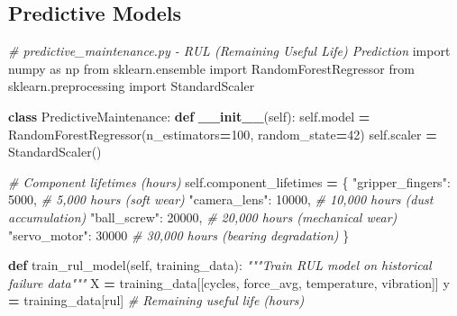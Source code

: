 \documentclass[
]{article}
\newenvironment{Shaded}{\begin{snugshade}}{\end{snugshade}}
\newcommand{\CommentTok}[1]{\textcolor[rgb]{0.56,0.35,0.01}{\textit{#1}}}
\newcommand{\DecValTok}[1]{\textcolor[rgb]{0.00,0.00,0.81}{#1}}
\newcommand{\FunctionTok}[1]{\textcolor[rgb]{0.13,0.29,0.53}{\textbf{#1}}}
\newcommand{\ImportTok}[1]{#1}
\newcommand{\KeywordTok}[1]{\textcolor[rgb]{0.13,0.29,0.53}{\textbf{#1}}}
\newcommand{\NormalTok}[1]{#1}
\newcommand{\OperatorTok}[1]{\textcolor[rgb]{0.81,0.36,0.00}{\textbf{#1}}}
\newcommand{\StringTok}[1]{\textcolor[rgb]{0.31,0.60,0.02}{#1}}
\newcommand{\VariableTok}[1]{\textcolor[rgb]{0.00,0.00,0.00}{#1}}
\begin{document}
\hypertarget{predictive-models}{%
\subsection{Predictive Models}\label{predictive-models}}

\begin{Shaded}
\begin{Highlighting}[]
\CommentTok{\# predictive\_maintenance.py {-} RUL (Remaining Useful Life) Prediction}
\ImportTok{import}\NormalTok{ numpy }\ImportTok{as}\NormalTok{ np}
\ImportTok{from}\NormalTok{ sklearn.ensemble }\ImportTok{import}\NormalTok{ RandomForestRegressor}
\ImportTok{from}\NormalTok{ sklearn.preprocessing }\ImportTok{import}\NormalTok{ StandardScaler}

\KeywordTok{class}\NormalTok{ PredictiveMaintenance:}
    \KeywordTok{def} \FunctionTok{\_\_init\_\_}\NormalTok{(}\VariableTok{self}\NormalTok{):}
        \VariableTok{self}\NormalTok{.model }\OperatorTok{=}\NormalTok{ RandomForestRegressor(n\_estimators}\OperatorTok{=}\DecValTok{100}\NormalTok{, random\_state}\OperatorTok{=}\DecValTok{42}\NormalTok{)}
        \VariableTok{self}\NormalTok{.scaler }\OperatorTok{=}\NormalTok{ StandardScaler()}

        \CommentTok{\# Component lifetimes (hours)}
        \VariableTok{self}\NormalTok{.component\_lifetimes }\OperatorTok{=}\NormalTok{ \{}
            \StringTok{"gripper\_fingers"}\NormalTok{: }\DecValTok{5000}\NormalTok{,  }\CommentTok{\# 5,000 hours (soft wear)}
            \StringTok{"camera\_lens"}\NormalTok{: }\DecValTok{10000}\NormalTok{,  }\CommentTok{\# 10,000 hours (dust accumulation)}
            \StringTok{"ball\_screw"}\NormalTok{: }\DecValTok{20000}\NormalTok{,  }\CommentTok{\# 20,000 hours (mechanical wear)}
            \StringTok{"servo\_motor"}\NormalTok{: }\DecValTok{30000}  \CommentTok{\# 30,000 hours (bearing degradation)}
\NormalTok{        \}}

    \KeywordTok{def}\NormalTok{ train\_rul\_model(}\VariableTok{self}\NormalTok{, training\_data):}
        \CommentTok{"""Train RUL model on historical failure data"""}
\NormalTok{        X }\OperatorTok{=}\NormalTok{ training\_data[[}\StringTok{\textquotesingle{}cycles\textquotesingle{}}\NormalTok{, }\StringTok{\textquotesingle{}force\_avg\textquotesingle{}}\NormalTok{, }\StringTok{\textquotesingle{}temperature\textquotesingle{}}\NormalTok{, }\StringTok{\textquotesingle{}vibration\textquotesingle{}}\NormalTok{]]}
\NormalTok{        y }\OperatorTok{=}\NormalTok{ training\_data[}\StringTok{\textquotesingle{}rul\textquotesingle{}}\NormalTok{]  }\CommentTok{\# Remaining useful life (hours)}


\end{Highlighting}
\end{Shaded}
\end{document}
